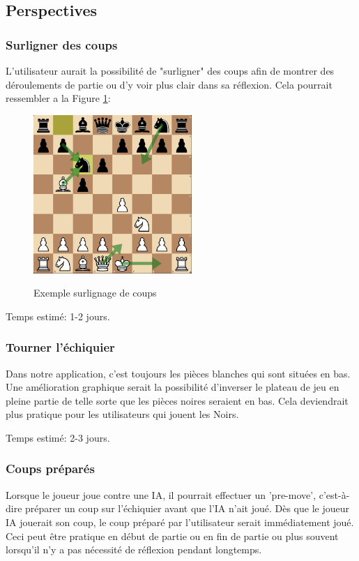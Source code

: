 \documentclass{article}
\begin{document}
\subsection{Perspectives}
\subsubsection{Surligner des coups}
L'utilisateur aurait la possibilité de "surligner" des coups afin de montrer des déroulements de partie ou d'y voir plus clair dans sa réflexion.
Cela pourrait ressembler a la Figure \ref{surlignage}:
\begin{figure}[h]
    \caption{Exemple surlignage de coups}
    \centering
    \includegraphics[width=\textwidth,height=6.0cm,keepaspectratio]{surlignage-coups}
    \label{surlignage}
\end{figure}
\FloatBarrier

Temps estimé: 1-2 jours.

\subsubsection{Tourner l'échiquier}
Dans notre application, c'est toujours les pièces blanches qui sont situées en bas. Une amélioration graphique serait la possibilité d'inverser le plateau
de jeu en pleine partie de telle sorte que les pièces noires seraient en bas. Cela deviendrait plus pratique pour les utilisateurs qui jouent les Noirs.

Temps estimé: 2-3 jours.

\subsubsection{Coups préparés}
Lorsque le joueur joue contre une IA, il pourrait effectuer un 'pre-move', c'est-à-dire préparer un coup sur l'échiquier avant que l'IA n'ait joué. Dès que
le joueur IA jouerait son coup, le coup préparé par l'utilisateur serait immédiatement joué. Ceci peut être pratique en début de partie ou en fin de partie
ou plus souvent lorsqu'il n'y a pas nécessité de réflexion pendant longtemps.
\end{document}
